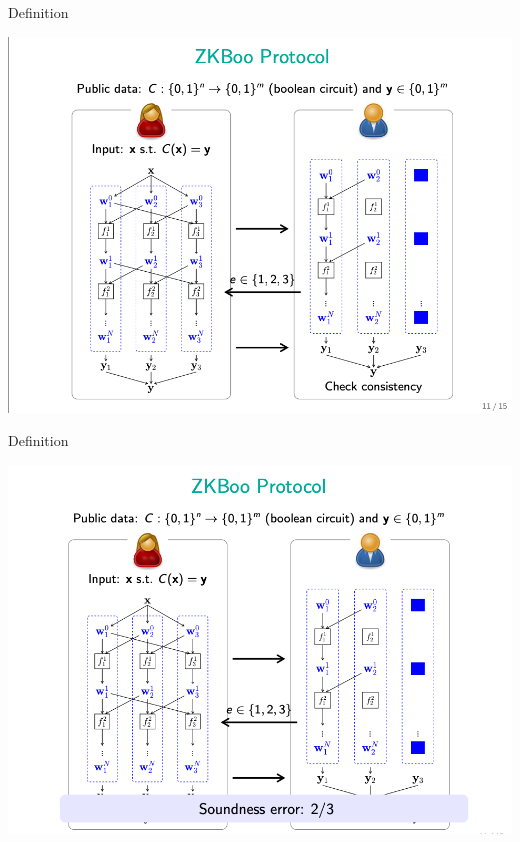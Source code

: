 \documentclass{beamer}
\begin{document}
\begin{frame}{Definition}
	\begin{minipage}{0.42\linewidth}
		\includegraphics[scale=0.4]{f24.png}
	\end{minipage}
\end{frame}


\begin{frame}{Definition}
	\begin{minipage}{0.42\linewidth}
		\includegraphics[scale=0.4]{f25.png}
	\end{minipage}
\end{frame}
\end{document}
